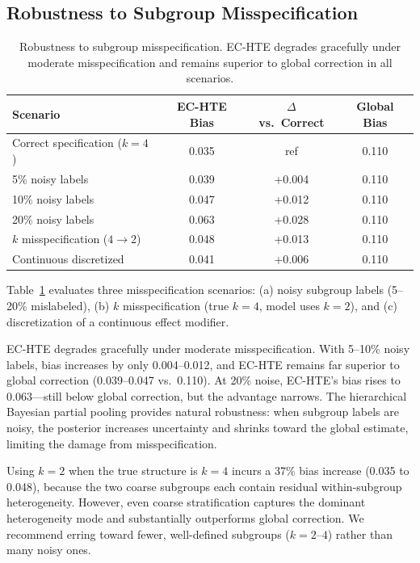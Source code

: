 \documentclass[11pt,a4paper]{article}
\begin{document}
\subsection{Robustness to Subgroup Misspecification}
\label{sec:robustness}

\begin{table}[t]
\centering
\small
\caption{Robustness to subgroup misspecification. EC-HTE degrades gracefully under moderate misspecification and remains superior to global correction in all scenarios.}
\label{tab:robustness}
\begin{tabular}{lccc}
\toprule
Scenario & EC-HTE Bias & $\Delta$ vs.\ Correct & Global Bias \\
\midrule
Correct specification ($k = 4$) & 0.035 & ref & 0.110 \\
5\% noisy labels & 0.039 & +0.004 & 0.110 \\
10\% noisy labels & 0.047 & +0.012 & 0.110 \\
20\% noisy labels & 0.063 & +0.028 & 0.110 \\
$k$ misspecification ($4 \to 2$) & 0.048 & +0.013 & 0.110 \\
Continuous discretized & 0.041 & +0.006 & 0.110 \\
\bottomrule
\end{tabular}
\end{table}

Table~\ref{tab:robustness} evaluates three misspecification scenarios:
(a) noisy subgroup labels (5--20\% mislabeled),
(b) $k$ misspecification (true $k = 4$, model uses $k = 2$), and
(c) discretization of a continuous effect modifier.

EC-HTE degrades gracefully under moderate misspecification.
With 5--10\% noisy labels, bias increases by only 0.004--0.012, and EC-HTE remains far superior to global correction (0.039--0.047 vs.\ 0.110).
At 20\% noise, EC-HTE's bias rises to 0.063---still below global correction, but the advantage narrows.
The hierarchical Bayesian partial pooling provides natural robustness: when subgroup labels are noisy, the posterior increases uncertainty and shrinks toward the global estimate, limiting the damage from misspecification.

Using $k = 2$ when the true structure is $k = 4$ incurs a 37\% bias increase (0.035 to 0.048), because the two coarse subgroups each contain residual within-subgroup heterogeneity.
However, even coarse stratification captures the dominant heterogeneity mode and substantially outperforms global correction.
We recommend erring toward fewer, well-defined subgroups ($k = 2$--$4$) rather than many noisy ones.
\end{document}
